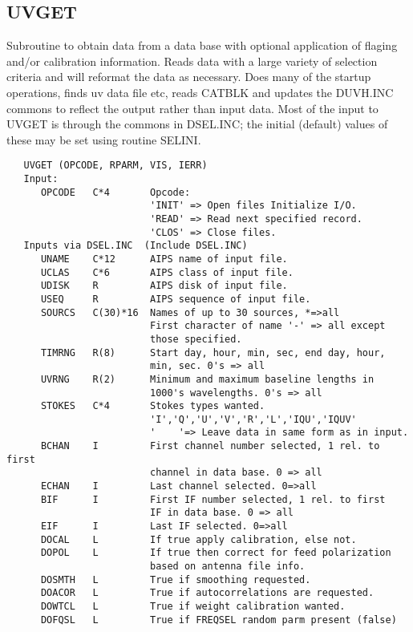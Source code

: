 \subsection{UVGET}
Subroutine to obtain data from a data base with optional application
of flaging and/or calibration information.  Reads data with a large
variety of selection criteria and will reformat the data as
necessary.  Does many of the startup operations, finds uv data file
etc, reads CATBLK and updates the DUVH.INC commons to reflect the
output rather than input data.
   Most of the input to UVGET is through the commons in DSEL.INC;
the initial (default) values of these may be set using routine
SELINI.
\begin{verbatim}
   UVGET (OPCODE, RPARM, VIS, IERR)
   Input:
      OPCODE   C*4       Opcode:
                         'INIT' => Open files Initialize I/O.
                         'READ' => Read next specified record.
                         'CLOS' => Close files.
   Inputs via DSEL.INC  (Include DSEL.INC)
      UNAME    C*12      AIPS name of input file.
      UCLAS    C*6       AIPS class of input file.
      UDISK    R         AIPS disk of input file.
      USEQ     R         AIPS sequence of input file.
      SOURCS   C(30)*16  Names of up to 30 sources, *=>all
                         First character of name '-' => all except
                         those specified.
      TIMRNG   R(8)      Start day, hour, min, sec, end day, hour,
                         min, sec. 0's => all
      UVRNG    R(2)      Minimum and maximum baseline lengths in
                         1000's wavelengths. 0's => all
      STOKES   C*4       Stokes types wanted.
                         'I','Q','U','V','R','L','IQU','IQUV'
                         '    '=> Leave data in same form as in input.
      BCHAN    I         First channel number selected, 1 rel. to first
                         channel in data base. 0 => all
      ECHAN    I         Last channel selected. 0=>all
      BIF      I         First IF number selected, 1 rel. to first
                         IF in data base. 0 => all
      EIF      I         Last IF selected. 0=>all
      DOCAL    L         If true apply calibration, else not.
      DOPOL    L         If true then correct for feed polarization
                         based on antenna file info.
      DOSMTH   L         True if smoothing requested.
      DOACOR   L         True if autocorrelations are requested.
      DOWTCL   L         True if weight calibration wanted.
      DOFQSL   L         True if FREQSEL random parm present (false)

\end{verbatim}
